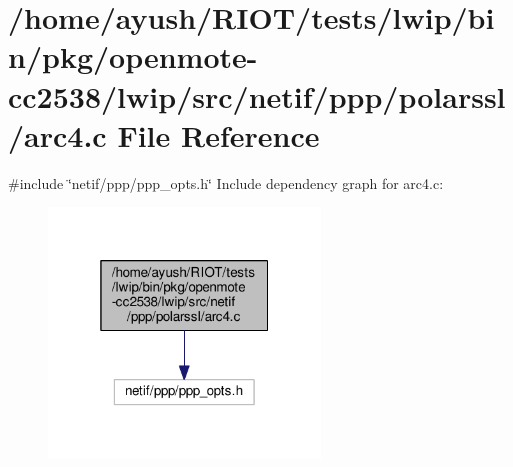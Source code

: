 \hypertarget{openmote-cc2538_2lwip_2src_2netif_2ppp_2polarssl_2arc4_8c}{}\section{/home/ayush/\+R\+I\+O\+T/tests/lwip/bin/pkg/openmote-\/cc2538/lwip/src/netif/ppp/polarssl/arc4.c File Reference}
\label{openmote-cc2538_2lwip_2src_2netif_2ppp_2polarssl_2arc4_8c}
{\ttfamily \#include \char`\"{}netif/ppp/ppp\+\_\+opts.\+h\char`\"{}}\newline
Include dependency graph for arc4.\+c\+:
\nopagebreak
\begin{figure}[H]
\begin{center}
\leavevmode
\includegraphics[width=205pt]{openmote-cc2538_2lwip_2src_2netif_2ppp_2polarssl_2arc4_8c__incl}
\end{center}
\end{figure}
